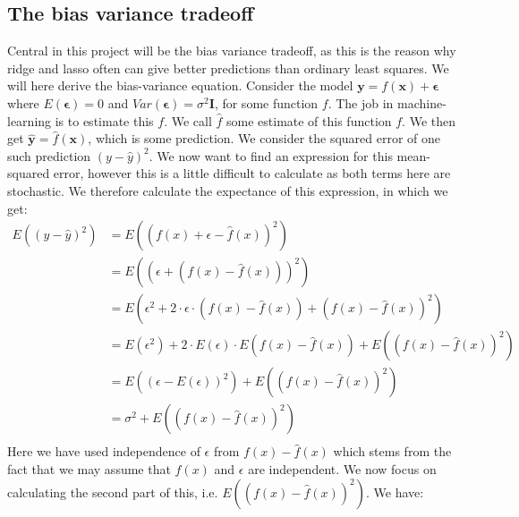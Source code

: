 \documentclass{article}
\begin{document}
\subsection{The bias variance tradeoff}
Central in this project will be the bias variance tradeoff, as this is the reason
why ridge and lasso often can give better predictions than ordinary least
squares. We will here derive the bias-variance equation. Consider the model
$\mathbf{y} = f(\mathbf{x}) + \bm{\epsilon}$ where $E(\bm{\epsilon}) = 0$ and
$Var(\bm{\epsilon}) = \sigma^2 \mathbf{I}$, for some function $f$. The job in machine-learning
is to estimate this $f$. We call $\hat{f}$ some estimate of this function $f$.
We then get $\hat{\mathbf{y}} = \hat{f}(\mathbf{x})$, which is some prediction.
We consider the squared error of one such prediction $(y - \hat{y})^2$. We
now want to find an expression for this mean-squared error, however this is a
little difficult to calculate as both terms here are stochastic. We therefore
calculate the expectance of this expression, in which we get:
\begin{align*}
    E((y - \hat{y})^2) & = E((f(x) + \epsilon - \hat{f}(x))^2)                                                      \\
                       & = E((\epsilon + (f(x) - \hat{f}(x)))^2)                                                    \\
                       & = E(\epsilon^2 + 2\cdot \epsilon \cdot (f(x) - \hat{f}(x)) + (f(x) - \hat{f}(x))^2)        \\
                       & = E(\epsilon^2) + 2\cdot E(\epsilon) \cdot E(f(x) - \hat{f}(x)) + E((f(x) - \hat{f}(x))^2) \\
                       & = E((\epsilon - E(\epsilon))^2) + E((f(x) - \hat{f}(x))^2)                                 \\
                       & = \sigma^2 + E((f(x) - \hat{f}(x))^2)                                                      \\
\end{align*}
Here we have used independence of $\epsilon$ from $f(x) - \hat{f}(x)$ which
stems from the fact that we may assume that $\hat{f}(x)$ and $\epsilon$ are
independent. We now focus on calculating the second part of this, i.e. $E((f(x)
    - \hat{f}(x))^2)$. We have:
\end{document}
